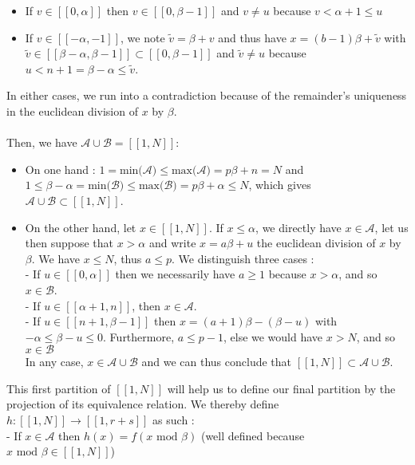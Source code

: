 \documentclass{article}
\newtheorem{computational theorem}{Computational Theorem}[section]
\begin{document}
\begin{itemize}
\item If $v \in [\![0,\alpha]\!]$ then $v \in [\![0,\beta - 1]\!]$ and $v \neq u$ because $v < \alpha + 1 \leqslant u$
\item If $v \in [\![-\alpha,-1]\!]$, we note $\tilde{v} = \beta + v$ and thus have $x = (b-1)\beta + \tilde{v}$ with $\tilde{v} \in [\![\beta - \alpha,\beta - 1]\!] \subset [\![0,\beta - 1]\!]$ and $\tilde{v} \neq u$ because $u < n+1 = \beta - \alpha \leqslant \tilde{v}$.
\end{itemize}
In either cases, we run into a contradiction because of the remainder's uniqueness in the euclidean division of $x$ by $\beta$.\\
\\
Then, we have \underline{$\mathcal{A} \cup \mathcal{B} = [\![1,N]\!]$}:
\begin{itemize}
\item On one hand : $1 = \text{min($\mathcal{A}$)} \leqslant \text{max($\mathcal{A}$)} = p\beta + n = N$ and $1 \leqslant \beta - \alpha = \text{min($\mathcal{B}$)} \leqslant \text{max($\mathcal{B}$)} = p\beta + \alpha \leqslant N$, which gives $\mathcal{A} \cup \mathcal{B} \subset [\![1,N]\!]$.
\item On the other hand, let $x \in  [\![1,N]\!]$. If $x \leqslant \alpha$, we directly have $x \in \mathcal{A}$, let us then suppose that $x > \alpha$ and write $x = a\beta + u$ the euclidean division of $x$ by $\beta$. We have $x \leqslant N$, thus $a \leqslant p$. We distinguish three cases : \\
- If $u \in [\![0,\alpha]\!]$ then we necessarily have $a \geqslant 1$ because $x > \alpha$, and so $x \in \mathcal{B}$.\\
- If $u \in [\![\alpha + 1,n]\!]$, then $x \in \mathcal{A}$. \\
- If $u \in [\![n + 1,\beta - 1]\!]$ then $x = (a+1)\beta - (\beta - u)$ with $-\alpha \leqslant \beta - u \leqslant 0$. Furthermore, $a \leqslant p - 1$, else we would have $x > N$, and so $x \in \mathcal{B}$ \\
In any case, $x \in \mathcal{A} \cup \mathcal{B}$ and we can thus conclude that $[\![1,N]\!] \subset \mathcal{A} \cup \mathcal{B}$.
\end{itemize}
This first partition of $[\![1,N]\!]$ will help us to define our final partition by the projection of its equivalence relation. We thereby define $h : [\![1,N]\!] \longrightarrow [\![1,r+s]\!]$ as such :\\
- If $x \in \mathcal{A}$ then $h(x) = f(x \text{ mod } \beta)$ (well defined because $x \text{ mod } \beta \in [\![1,N]\!]$)\\
\end{document}
